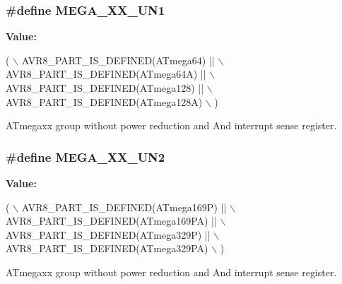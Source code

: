 \subsubsection[{M\+E\+G\+A\+\_\+\+X\+X\+\_\+\+U\+N1}]{\setlength{\rightskip}{0pt plus 5cm}\#define M\+E\+G\+A\+\_\+\+X\+X\+\_\+\+U\+N1}\label{group__mega__part__macros__group_gaad35e34280ef078dec0cc18c3ea6d3f6}
{\bfseries Value\+:}
\begin{DoxyCode}
( \(\backslash\)
        AVR8\_PART\_IS\_DEFINED(ATmega64)    || \(\backslash\)
        AVR8\_PART\_IS\_DEFINED(ATmega64A)   || \(\backslash\)
        AVR8\_PART\_IS\_DEFINED(ATmega128)   || \(\backslash\)
        AVR8\_PART\_IS\_DEFINED(ATmega128A) \(\backslash\)
        )
\end{DoxyCode}
A\+Tmegaxx group without power reduction and And interrupt sense register. \hypertarget{group__mega__part__macros__group_ga5f4566d4ddaa3cee92d4c78162594f2d}{}
\subsubsection[{M\+E\+G\+A\+\_\+\+X\+X\+\_\+\+U\+N2}]{\setlength{\rightskip}{0pt plus 5cm}\#define M\+E\+G\+A\+\_\+\+X\+X\+\_\+\+U\+N2}\label{group__mega__part__macros__group_ga5f4566d4ddaa3cee92d4c78162594f2d}
{\bfseries Value\+:}
\begin{DoxyCode}
( \(\backslash\)
        AVR8\_PART\_IS\_DEFINED(ATmega169P)  || \(\backslash\)
        AVR8\_PART\_IS\_DEFINED(ATmega169PA) || \(\backslash\)
        AVR8\_PART\_IS\_DEFINED(ATmega329P)  || \(\backslash\)
        AVR8\_PART\_IS\_DEFINED(ATmega329PA) \(\backslash\)
        )
\end{DoxyCode}
A\+Tmegaxx group without power reduction and And interrupt sense register. 